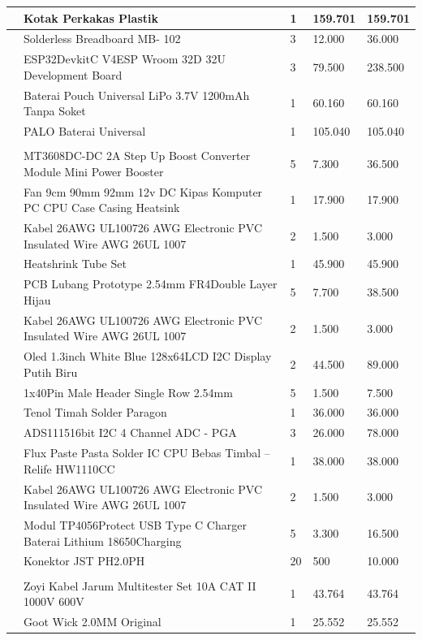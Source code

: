 \documentclass[a4paper,12pt]{article}
\begin{document}
\begin{longtable}{|p{}|p{}|p{}|p{}|p{}|}
\hline
 & Kotak Perkakas Plastik & 1 & 159.701 & 159.701 \\
\hline
 & Solderless Breadboard MB- 102 & 3 & 12.000 & 36.000 \\
\hline
 & ESP32DevkitC V4ESP Wroom 32D 32U Development Board & 3 & 79.500 & 238.500 \\
\hline
 & Baterai Pouch Universal LiPo 3.7V 1200mAh Tanpa Soket & 1 & 60.160 & 60.160 \\
\hline
 & PALO Baterai Universal & 1 & 105.040 & 105.040 \\
\hline
 &  &  &  &  \\
\hline
 & MT3608DC-DC 2A Step Up Boost Converter Module Mini Power Booster & 5 & 7.300 & 36.500 \\
\hline
 & Fan 9cm 90mm 92mm 12v DC Kipas Komputer PC CPU Case Casing Heatsink & 1 & 17.900 & 17.900 \\
\hline
 & Kabel 26AWG UL100726 AWG Electronic PVC Insulated Wire AWG 26UL 1007 & 2 & 1.500 & 3.000 \\
\hline
 & Heatshrink Tube Set & 1 & 45.900 & 45.900 \\
\hline
 & PCB Lubang Prototype 2.54mm FR4Double Layer Hijau & 5 & 7.700 & 38.500 \\
\hline
 & Kabel 26AWG UL100726 AWG Electronic PVC Insulated Wire AWG 26UL 1007 & 2 & 1.500 & 3.000 \\
\hline
 & Oled 1.3inch White Blue 128x64LCD I2C Display Putih Biru & 2 & 44.500 & 89.000 \\
\hline
 & 1x40Pin Male Header Single Row 2.54mm & 5 & 1.500 & 7.500 \\
\hline
 & Tenol Timah Solder Paragon & 1 & 36.000 & 36.000 \\
\hline
 & ADS111516bit I2C 4 Channel ADC - PGA & 3 & 26.000 & 78.000 \\
\hline
 & Flux Paste Pasta Solder IC CPU Bebas Timbal – Relife HW1110CC & 1 & 38.000 & 38.000 \\
\hline
 & Kabel 26AWG UL100726 AWG Electronic PVC Insulated Wire AWG 26UL 1007 & 2 & 1.500 & 3.000 \\
\hline
 & Modul TP4056Protect USB Type C Charger Baterai Lithium 18650Charging & 5 & 3.300 & 16.500 \\
\hline
 & Konektor JST PH2.0PH & 20 & 500 & 10.000 \\
\hline
 &  &  &  &  \\
\hline
 & Zoyi Kabel Jarum Multitester Set 10A CAT II 1000V 600V & 1 & 43.764 & 43.764 \\
\hline
 & Goot Wick 2.0MM Original & 1 & 25.552 & 25.552 \\

\end{longtable}
\end{document}
